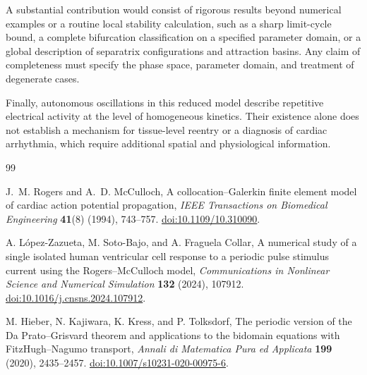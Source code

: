 \documentclass[11pt,reqno]{amsart}
\theoremstyle{plain}
\theoremstyle{definition}
\theoremstyle{remark}
\begin{document}
A substantial contribution would consist of rigorous
results beyond numerical examples or a routine local
stability calculation, such as a sharp limit-cycle
bound, a complete bifurcation classification on a
specified parameter domain, or a global description
of separatrix configurations and attraction basins.
Any claim of completeness must specify the phase space,
parameter domain, and treatment of degenerate cases.

Finally, autonomous oscillations in this reduced model
describe repetitive electrical activity at the level
of homogeneous kinetics. Their existence alone does
not establish a mechanism for tissue-level reentry or
a diagnosis of cardiac arrhythmia, which require
additional spatial and physiological information.

\begin{thebibliography}{99}

J.~M. Rogers and A.~D. McCulloch,
A collocation--Galerkin finite element model of cardiac
action potential propagation,
\emph{IEEE Transactions on Biomedical Engineering}
\textbf{41}(8) (1994), 743--757.
\href{https://doi.org/10.1109/10.310090}
{doi:10.1109/10.310090}.

A. L\'opez-Zazueta, M. Soto-Bajo, and A. Fraguela Collar,
A numerical study of a single isolated human ventricular
cell response to a periodic pulse stimulus current using
the Rogers--McCulloch model,
\emph{Communications in Nonlinear Science and
Numerical Simulation}
\textbf{132} (2024), 107912.
\href{https://doi.org/10.1016/j.cnsns.2024.107912}
{doi:10.1016/j.cnsns.2024.107912}.

M. Hieber, N. Kajiwara, K. Kress, and P. Tolksdorf,
The periodic version of the Da Prato--Grisvard theorem
and applications to the bidomain equations with
FitzHugh--Nagumo transport,
\emph{Annali di Matematica Pura ed Applicata}
\textbf{199} (2020), 2435--2457.
\href{https://doi.org/10.1007/s10231-020-00975-6}
{doi:10.1007/s10231-020-00975-6}.

\end{thebibliography}













\end{document}
